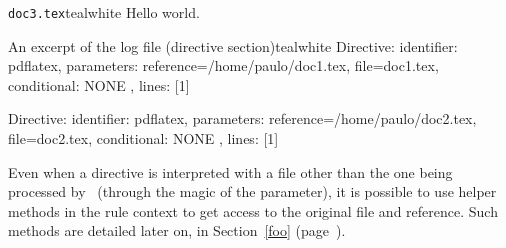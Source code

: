 \begin{codebox}{\texttt{doc3.tex}}{teal}{\icnote}{white}
Hello world.
\bye
\end{codebox}

\begin{codebox}{An excerpt of the log file (directive section)}{teal}{\icnote}{white}
Directive: { identifier: pdflatex, parameters:
{reference=/home/paulo/doc1.tex, file=doc1.tex},
conditional: { NONE }, lines: [1] }

Directive: { identifier: pdflatex, parameters:
{reference=/home/paulo/doc2.tex, file=doc2.tex},
conditional: { NONE }, lines: [1] }
\end{codebox}

Even when a directive is interpreted with a file other than the one being processed by \arara\ (through the magic of the  parameter), it is possible to use helper methods in the rule context to get access to the original file and reference. Such methods are detailed later on, in Section~\ref{foo} (page~\pageref{foo}).